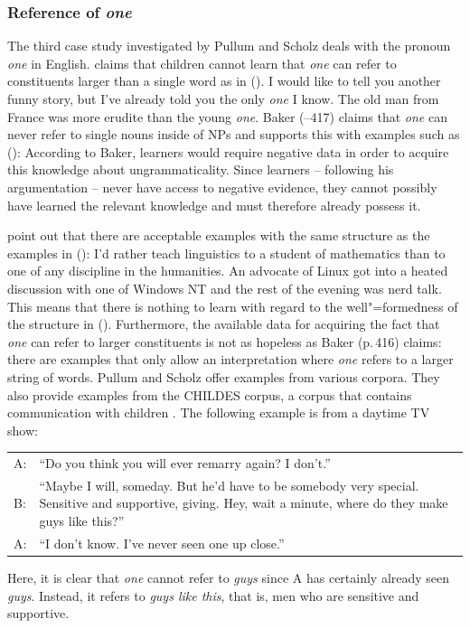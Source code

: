 \subsubsection{Reference of \emph{one}}

The third case study investigated by Pullum and Scholz deals with the pronoun \emph{one} in English.
\citet[--425, 327--340]{Baker78a-u} claims that children cannot learn that \emph{one} can refer to constituents
larger than a single word as in ().
\eal
\ex I would like to tell you another funny story, but I've already told you the only \emph{one} I
know.
\ex The old man from France was more erudite than the young \emph{one}.
\zl
Baker (--417) claims that \emph{one} can never refer to single nouns inside of NPs and supports this
with examples such as ():
\z
According to Baker, learners would require negative data in order to acquire this knowledge about ungrammaticality.
Since learners -- following his argumentation -- never have access to negative evidence, they cannot possibly have learned the relevant
knowledge and must therefore already possess it.

\citet[]{PS2002a} point out that there are acceptable examples with the same structure as
the examples in (): 
\eal
\ex I'd rather teach linguistics to a student of mathematics than to
one of any discipline in the humanities.
\ex An advocate of Linux got into a heated discussion with one of
Windows NT and the rest of the evening was nerd talk.
\zl
\noindent
This means that there is nothing to learn with regard to the well"=formedness of the structure in ().
Furthermore, the available data for acquiring the fact that \emph{one} can refer to larger constituents is not as hopeless
as Baker (p.\,416) claims: there are examples that only allow an interpretation where \emph{one} refers to a larger
string of words. Pullum and Scholz offer examples from various corpora. They also provide examples from the CHILDES corpus,
a corpus that contains communication with children \citep{MacWhinny91a-u}. The following example is from a daytime TV show:
\eanoraggedright
\begin{tabular}[t]{@{}l@{~}p{11cm}}
A: & ``Do you think you will ever remarry again? I don't.''\\
B: & ``Maybe I will, someday. But he'd have to be somebody very special. Sensitive and supportive, giving. Hey, wait a minute, where
   do they make guys like this?''\\
A: & ``I don't know. I've never seen one up close.''\\
\end{tabular}
\z
Here, it is clear that \emph{one}  cannot refer to \emph{guys} since A has certainly already seen \emph{guys}.
Instead, it refers to \emph{guys like this}, that is, men who are sensitive and supportive.   

